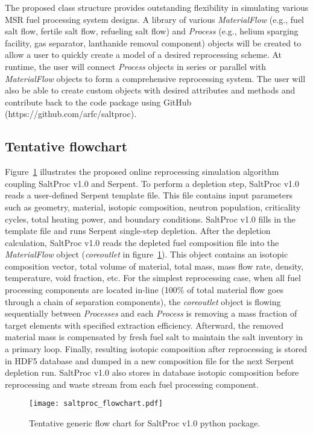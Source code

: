 The proposed class structure provides outstanding flexibility in simulating 
various \gls{MSR} fuel processing system designs. A library of various  
\textit{MaterialFlow} (e.g., fuel salt flow, fertile salt flow, refueling salt 
flow) and \textit{Process} (e.g., helium sparging facility, gas separator, 
lanthanide removal component) objects will be created to allow a user to 
quickly create a model of a desired reprocessing scheme. At runtime, the user 
will connect \textit{Process} objects in series or parallel with 
\textit{MaterialFlow} objects to form a comprehensive reprocessing system. The 
user will also be able to create custom objects with desired attributes and 
methods and contribute back to the code package using GitHub 
(https://github.com/arfc/saltproc).	

\subsection{Tentative flowchart}
Figure~\ref{fig:saltproc_flow} illustrates the proposed online reprocessing 
simulation algorithm coupling SaltProc v1.0 and Serpent. To perform a 
depletion step, SaltProc v1.0 reads a user-defined Serpent template file. 
This file contains input parameters such as geometry, material, isotopic 
composition, neutron population, criticality cycles, total heating power, and 
boundary conditions. SaltProc v1.0 fills in the template file and runs 
Serpent single-step depletion. After the depletion calculation, SaltProc v1.0 
reads the depleted fuel composition file into the \textit{MaterialFlow} object 
(\textit{core\textunderscore outlet} in figure~\ref{fig:saltproc_flow}). This 
object contains an isotopic composition vector, total volume of material, 
total mass, mass flow rate, density, temperature, void fraction, etc. For the 
simplest reprocessing case, when all fuel processing components are located 
in-line (100\% of total material flow goes through a chain of separation 
components), the \textit{core\textunderscore outlet} 
object is flowing sequentially between \textit{Processes} and each 
\textit{Process} is removing a mass fraction of target elements with specified 
extraction efficiency. Afterward, the removed material mass is compensated by 
fresh fuel salt to maintain the salt inventory in a primary loop. 
Finally, resulting isotopic composition after reprocessing is stored in 
HDF5 database and dumped in a new composition file for the next 
Serpent depletion run. SaltProc v1.0 also stores in database isotopic  
composition before reprocessing and waste stream from each fuel processing 
component. 
\begin{figure}[ht!] %
	\centering
	\texttt{[image: saltproc\_flowchart.pdf]}
	\vspace{-0.15in}
	\caption{Tentative generic flow chart for SaltProc v1.0 python package.}
	\label{fig:saltproc_flow}
\end{figure}

